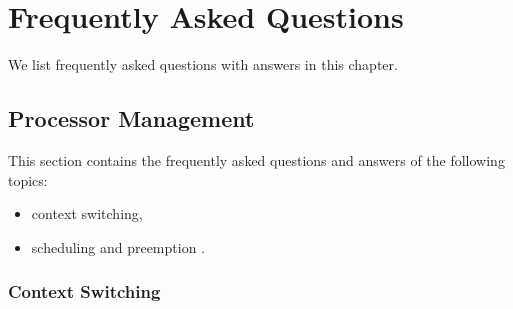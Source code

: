 \chapter{Frequently Asked Questions}
We list frequently asked questions with answers in this chapter.
\section{Processor Management}
This section contains the frequently asked questions and answers of the following topics:
\begin{itemize}
\item context switching,
\item scheduling and preemption .
\end{itemize}
\subsection{Context Switching}
